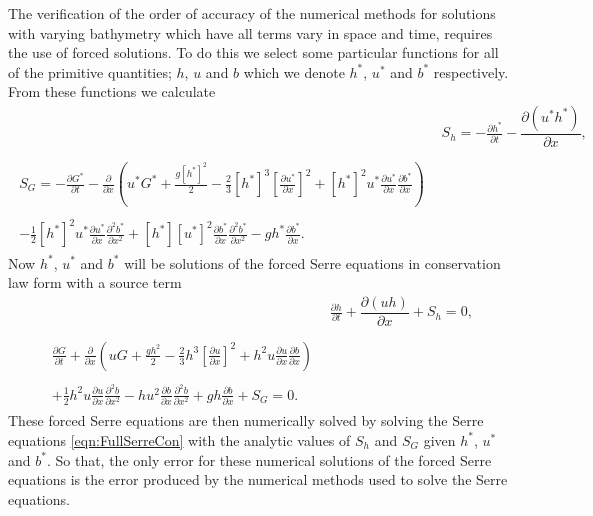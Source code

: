 The verification of the order of accuracy of the numerical methods for solutions with varying bathymetry which have all terms vary in space and time, requires the use of forced solutions. To do this we select some particular functions for all of the primitive quantities; $h$, $u$ and $b$ which we denote $h^*$, $u^*$ and $b^*$ respectively. From these functions we calculate 
\begin{align*}
&  S_{h} = -\frac{\partial h^*}{\partial t} - \dfrac{\partial (u^*h^*)}{\partial x} ,  \\ \nonumber \\
\begin{split}
S_{G} = -\frac{\partial G^*}{\partial t}  - \frac{\partial}{\partial x} \left( {u}^* G^* + \frac{g\left[h^*\right]^2}{2} - \frac{2}{3}\left[h^*\right]^3 \left[\frac{\partial {u}^*}{\partial x}\right]^2 + \left[h^*\right]^2 {u^*}\frac{\partial {u}^*}{\partial x}\frac{\partial b^*}{\partial x} \right) \\ \\ - \frac{1}{2}\left[h^*\right]^2 {u}^* \frac{\partial {u}^*}{\partial x} \frac{\partial^2 b^*}{\partial x^2}  + \left[h^*\right] {\left[u^*\right]}^2\frac{\partial b^*}{\partial x}\frac{\partial^2 b^*}{\partial x^2} - gh^*\frac{\partial b^*}{\partial x}.
\end{split}
\end{align*} 
Now $h^*$, $u^*$ and $b^*$ will be solutions of the forced Serre equations in conservation law form with a source term
\begin{subequations}
	\label{eqn:FullSerreConForced}
	\begin{align}
	& \frac{\partial h}{\partial t} + \dfrac{\partial (uh)}{\partial x} + S_{h}  = 0 ,\label{eqn:FullSerreConMassForced}  \\ \nonumber \\
	\begin{split}
	\label{eqn:SerreconsconmomForced}
	\frac{\partial G}{\partial t}  + \frac{\partial}{\partial x} \left( {u} G + \frac{gh^2}{2} - \frac{2}{3}h^3 \left[ \frac{\partial {u}}{\partial x} \right]^2 + h^2 {u}\frac{\partial {u}}{\partial x}\frac{\partial b}{\partial x} \right) \\ \\ + \frac{1}{2}h^2 {u} \frac{\partial {u}}{\partial x} \frac{\partial^2 b}{\partial x^2}  - h {u}^2\frac{\partial b}{\partial x}\frac{\partial^2 b}{\partial x^2} + gh\frac{\partial b}{\partial x} + S_{G} = 0.
	\end{split}
	\end{align}
\end{subequations}
These forced Serre equations are then numerically solved by solving the Serre equations \eqref{eqn:FullSerreCon} with the analytic values of $S_{h}$ and $S_{G}$ given $h^*$, $u^*$ and $b^*$. So that, the only error for these numerical solutions of the forced Serre equations is the error produced by the numerical methods used to solve the Serre equations. 

